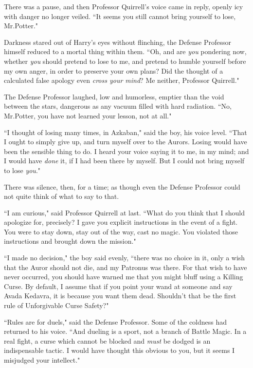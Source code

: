 There was a pause, and then Professor Quirrell's voice came in reply, openly icy with danger no longer veiled. ``It seems you still cannot bring yourself to lose, Mr.\?Potter."

Darkness stared out of Harry's eyes without flinching, the Defense Professor himself reduced to a mortal thing within them. ``Oh, and are \emph{you} pondering now, whether \emph{you} should pretend to lose to me, and pretend to humble yourself before my own anger, in order to preserve your own plans? Did the thought of a calculated false apology even \emph{cross your mind}? Me neither, Professor Quirrell."

The Defense Professor laughed, low and humorless, emptier than the void between the stars, dangerous as any vacuum filled with hard radiation. ``No, Mr.\?Potter, you have not learned your lesson, not at all."

``I thought of losing many times, in Azkaban," said the boy, his voice level. ``That I ought to simply give up, and turn myself over to the Aurors. Losing would have been the sensible thing to do. I heard your voice saying it to me, in my mind; and I would have \emph{done} it, if I had been there by myself. But I could not bring myself to lose \emph{you}."

There was silence, then, for a time; as though even the Defense Professor could not quite think of what to say to that.

``I am curious," said Professor Quirrell at last. ``What do you think that I should apologize for, precisely? I gave you explicit instructions in the event of a fight. You were to stay down, stay out of the way, cast no magic. You violated those instructions and brought down the mission."

``I made no decision," the boy said evenly, ``there was no choice in it, only a wish that the Auror should not die, and my Patronus was there. For that wish to have never occurred, you should have warned me that you might bluff using a Killing Curse. By default, I assume that if you point your wand at someone and say Avada Kedavra, it is because you want them dead. Shouldn't that be the first rule of Unforgivable Curse Safety?"

``Rules are for duels," said the Defense Professor. Some of the coldness had returned to his voice. ``And dueling is a sport, not a branch of Battle Magic. In a real fight, a curse which cannot be blocked and \emph{must} be dodged is an indispensable tactic. I would have thought this obvious to you, but it seems I misjudged your intellect."

